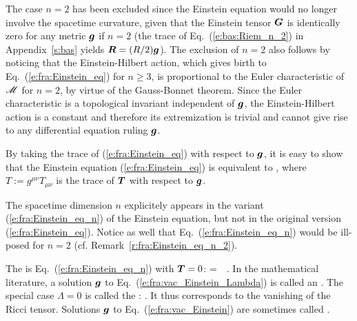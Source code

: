 \begin{remark} \label{r:fra:Einstein_eq_n_2}
The case $n=2$ has been excluded since the Einstein equation would
no longer involve the spacetime curvature, given that the Einstein tensor
$\bm{G}$ is identically zero for any metric $\bm{g}$ if $n=2$
(the trace of Eq.~(\ref{e:bas:Riem_n_2}) in Appendix~\ref{s:bas} yields
$\bm{R} = (R/2) \bm{g}$).
The exclusion of $n=2$ also follows by noticing that
the Einstein-Hilbert action,
which gives birth to Eq.~(\ref{e:fra:Einstein_eq})
for $n\geq 3$, is proportional to the
Euler characteristic
of $\mathscr{M}$ for $n=2$, by virtue of the Gauss-Bonnet theorem.
Since the Euler characteristic is a topological invariant independent of $\bm{g}$,
the Einstein-Hilbert action is a constant and therefore its extremization is trivial
and cannot give rise to any differential equation ruling $\bm{g}$.
\end{remark}

By taking the trace of (\ref{e:fra:Einstein_eq}) with respect to $\bm{g}$, it is
easy to show that the Einstein equation (\ref{e:fra:Einstein_eq}) is
equivalent to
\be \label{e:fra:Einstein_eq_n}
    ,
\ee
where $T := g^{\mu\nu} T_{\mu\nu}$ is the trace of $\bm{T}$ with respect to
$\bm{g}$.

\begin{remark}
The spacetime dimension $n$ explicitely appears in the variant (\ref{e:fra:Einstein_eq_n})
of the Einstein equation, but not in the original version (\ref{e:fra:Einstein_eq}).
Notice as well that Eq.~(\ref{e:fra:Einstein_eq_n}) would be ill-posed for $n=2$
(cf. Remark~\ref{r:fra:Einstein_eq_n_2}).
\end{remark}

The  is
Eq.~(\ref{e:fra:Einstein_eq_n}) with $\bm{T}=0$:
\be \label{e:fra:vac_Einstein_Lambda}
      = \,\Lambda\,   .
\ee
In the mathematical literature, a solution $\bm{g}$ to Eq.~(\ref{e:fra:vac_Einstein_Lambda})
is called an .
The special case $\Lambda=0$ is called the
:
 \be \label{e:fra:vac_Einstein}
    .
\ee
It thus corresponds to the vanishing of the Ricci tensor. Solutions $\bm{g}$ to
Eq.~(\ref{e:fra:vac_Einstein}) are sometimes called
.

